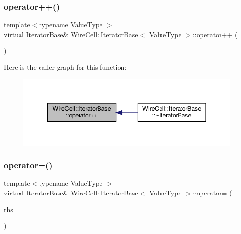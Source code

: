 \subsubsection{\texorpdfstring{operator++()}{operator++()}}
{\footnotesize\ttfamily template$<$typename Value\+Type $>$ \\
virtual \hyperlink{class_wire_cell_1_1_iterator_base}{Iterator\+Base}\& \hyperlink{class_wire_cell_1_1_iterator_base}{Wire\+Cell\+::\+Iterator\+Base}$<$ Value\+Type $>$\+::operator++ (\begin{DoxyParamCaption}{ }\end{DoxyParamCaption})\hspace{0.3cm}{\ttfamily [pure virtual]}}

Here is the caller graph for this function\+:
\nopagebreak
\begin{figure}[H]
\begin{center}
\leavevmode
\includegraphics[width=342pt]{class_wire_cell_1_1_iterator_base_a8f75296f57c6f4261dc3c4f7c085a5b8_icgraph}
\end{center}
\end{figure}
\mbox{\label{class_wire_cell_1_1_iterator_base_ad62dd2f5a05b89ce63ad9b9e62167856}} 
\subsubsection{\texorpdfstring{operator=()}{operator=()}}
{\footnotesize\ttfamily template$<$typename Value\+Type $>$ \\
virtual \hyperlink{class_wire_cell_1_1_iterator_base}{Iterator\+Base}\& \hyperlink{class_wire_cell_1_1_iterator_base}{Wire\+Cell\+::\+Iterator\+Base}$<$ Value\+Type $>$\+::operator= (\begin{DoxyParamCaption}\item[{const \hyperlink{class_wire_cell_1_1_iterator_base}{Iterator\+Base}$<$ Value\+Type $>$ \&}]{rhs }\end{DoxyParamCaption})\hspace{0.3cm}{\ttfamily [pure virtual]}}

